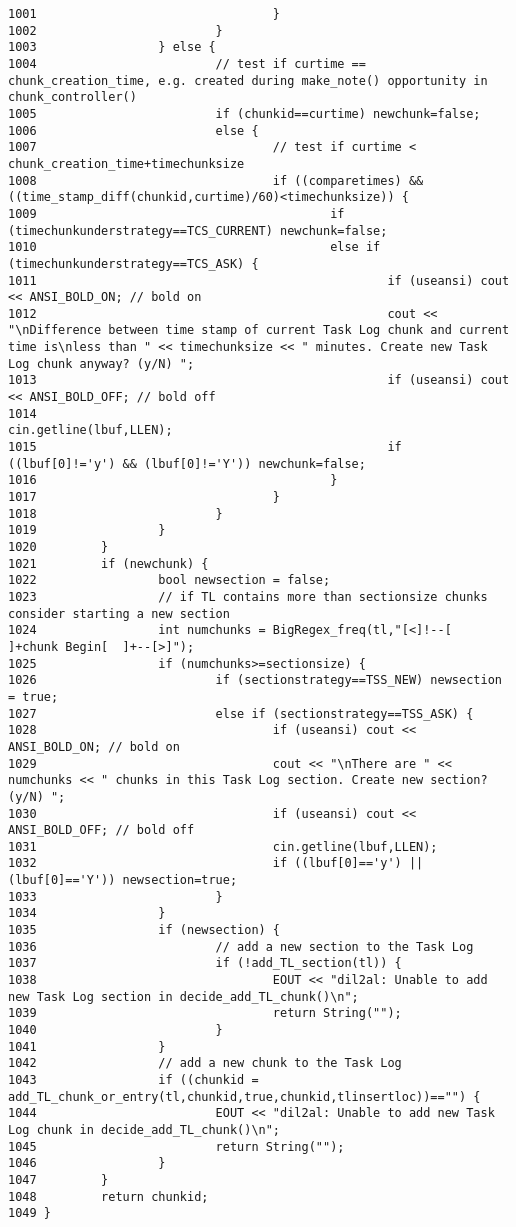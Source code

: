 \begin{verbatim}
1001                                 }
1002                         }
1003                 } else {
1004                         // test if curtime == chunk_creation_time, e.g. created during make_note() opportunity in chunk_controller()
1005                         if (chunkid==curtime) newchunk=false;
1006                         else {
1007                                 // test if curtime < chunk_creation_time+timechunksize
1008                                 if ((comparetimes) && ((time_stamp_diff(chunkid,curtime)/60)<timechunksize)) {
1009                                         if (timechunkunderstrategy==TCS_CURRENT) newchunk=false;
1010                                         else if (timechunkunderstrategy==TCS_ASK) {
1011                                                 if (useansi) cout << ANSI_BOLD_ON; // bold on
1012                                                 cout << "\nDifference between time stamp of current Task Log chunk and current time is\nless than " << timechunksize << " minutes. Create new Task Log chunk anyway? (y/N) ";
1013                                                 if (useansi) cout << ANSI_BOLD_OFF; // bold off
1014                                                 cin.getline(lbuf,LLEN);
1015                                                 if ((lbuf[0]!='y') && (lbuf[0]!='Y')) newchunk=false;
1016                                         }
1017                                 }
1018                         }
1019                 }
1020         }
1021         if (newchunk) {
1022                 bool newsection = false;
1023                 // if TL contains more than sectionsize chunks consider starting a new section
1024                 int numchunks = BigRegex_freq(tl,"[<]!--[       ]+chunk Begin[  ]+--[>]");
1025                 if (numchunks>=sectionsize) {
1026                         if (sectionstrategy==TSS_NEW) newsection = true;
1027                         else if (sectionstrategy==TSS_ASK) {
1028                                 if (useansi) cout << ANSI_BOLD_ON; // bold on
1029                                 cout << "\nThere are " << numchunks << " chunks in this Task Log section. Create new section? (y/N) ";
1030                                 if (useansi) cout << ANSI_BOLD_OFF; // bold off
1031                                 cin.getline(lbuf,LLEN);
1032                                 if ((lbuf[0]=='y') || (lbuf[0]=='Y')) newsection=true;
1033                         }
1034                 }
1035                 if (newsection) {
1036                         // add a new section to the Task Log
1037                         if (!add_TL_section(tl)) {
1038                                 EOUT << "dil2al: Unable to add new Task Log section in decide_add_TL_chunk()\n";
1039                                 return String("");
1040                         }
1041                 }
1042                 // add a new chunk to the Task Log
1043                 if ((chunkid = add_TL_chunk_or_entry(tl,chunkid,true,chunkid,tlinsertloc))=="") {
1044                         EOUT << "dil2al: Unable to add new Task Log chunk in decide_add_TL_chunk()\n";
1045                         return String("");
1046                 }
1047         }
1048         return chunkid;
1049 }
\end{verbatim}\normalsize 
